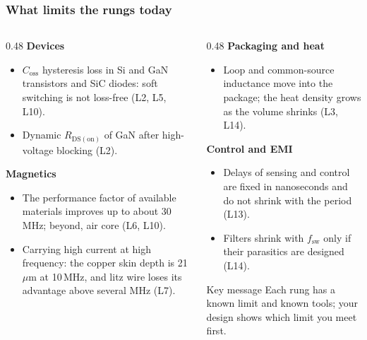 \begin{frame}
	\frametitle{What limits the rungs today}
	\begin{columns}[T]
		\begin{column}{0.48\textwidth}
			\footnotesize
			\textbf{Devices}
			\begin{itemize}
				\item $C_\mathrm{oss}$ hysteresis loss in Si and GaN transistors and SiC diodes: soft switching is not loss-free (L2, L5, L10).
				\item Dynamic $R_\mathrm{DS(on)}$ of GaN after high-voltage blocking (L2).
			\end{itemize}
			\textbf{Magnetics}
			\begin{itemize}
				\item The performance factor of available materials improves up to about 30\,MHz; beyond, air core (L6, L10).
				\item Carrying high current at high frequency: the copper skin depth is 21\,$\mu$m at 10\,MHz, and litz wire loses its advantage above several MHz (L7).
			\end{itemize}
		\end{column}
		\begin{column}{0.48\textwidth}
			\footnotesize
			\textbf{Packaging and heat}
			\begin{itemize}
				\item Loop and common-source inductance move into the package; the heat density grows as the volume shrinks (L3, L14).
			\end{itemize}
			\textbf{Control and EMI}
			\begin{itemize}
				\item Delays of sensing and control are fixed in nanoseconds and do not shrink with the period (L13).
				\item Filters shrink with $f_\mathrm{sw}$ only if their parasitics are designed (L14).
			\end{itemize}
			\begin{block}{Key message}
				Each rung has a known limit and known tools; your design shows which limit you meet first.
			\end{block}
		\end{column}
	\end{columns}
\end{frame}

